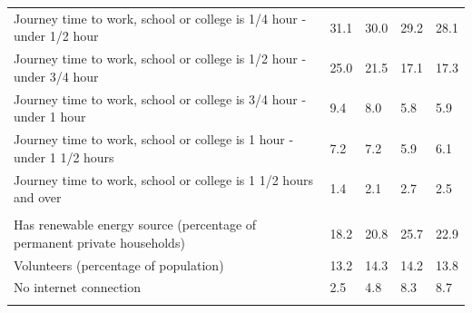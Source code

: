 \documentclass{article}
\begin{document}
\begin{table}[h]
\begin{tabular}{KTTTT}
Journey time to work, school or college is 1/4 hour - under 1/2 hour & 31.1& 30.0& 29.2& 28.1\\
Journey time to work, school or college is 1/2 hour - under 3/4 hour & 25.0& 21.5& 17.1& 17.3\\
Journey time to work, school or college is 3/4 hour - under 1 hour & 9.4& 8.0& 5.8& 5.9\\
Journey time to work, school or college is 1 hour - under 1 1/2 hours & 7.2& 7.2& 5.9& 6.1\\
Journey time to work, school or college is 1 1/2 hours and over & 1.4& 2.1& 2.7& 2.5\\
\hline
    \\ 
    \hline
Has renewable energy source (percentage of permanent private households) & 18.2& 20.8& 25.7& 22.9\\
    \hline
Volunteers (percentage of population) & 13.2& 14.3& 14.2& 13.8\\
    \hline
No internet connection& 2.5& 4.8& 8.3& 8.7\\
\hline
\end{tabular}
\end{table}
\end{document}
